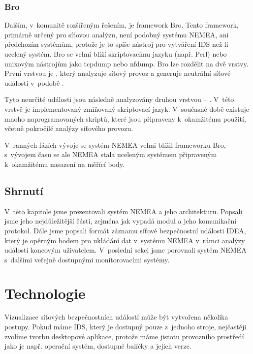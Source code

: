 \subsection*{Bro}
Dalším, v~komunitě rozšířeným řešením, je framework Bro. Tento framework, primárně určený pro síťovou analýzu, není podobný systému NEMEA, ani předchozím systémům, protože je to spíše nástroj pro vytváření IDS než-li ucelený systém. Bro se velmi blíží skriptovacímu jazyku (např. Perl) nebo unixovým nástrojům jako tcpdump nebo nfdump. Bro lze rozdělit na dvě vrstvy. První vrstvou je , který analyzuje síťový provoz a generuje neutrální síťové události v~podobě . 

Tyto neurčité události jsou následně analyzovány druhou vrstvou -- . V~této vrstvě je implementovaný zmiňovaný skriptovací jazyk. V~současné době existuje mnoho naprogramovaných skriptů, které jsou připraveny k~okamžitému použití, včetně pokročilé analýzy síťového provozu.

V~ranných fázích vývoje se systém NEMEA velmi blížil frameworku Bro, s~vývojem času se ale NEMEA stala uceleným systémem připraveným k~okamžitému nasazení na měřící body.

\section{Shrnutí}

V~této kapitole jsme prezentovali systém NEMEA a jeho architekturu. Popsali jsme jeho nejdůležitější části, zejména jak vypadá modul a jeho komunikační protokol. Dále jsme popsali formát záznamu síťové bezpečnostní události IDEA, který je opěrným bodem pro ukládání dat v~systému NEMEA v~rámci analýzy událostí koncovým uživatelem. V~poslední sekci jsme porovnali systém NEMEA s~dalšími veřejně dostupnými monitorovacími systémy.


\chapter{Technologie}

Vizualizace síťových bezpečnostních událostí může být vytvořena několika postupy. Pokud máme IDS, který je dostupný pouze z~jednoho stroje, nejčastěji zvolíme tvorbu desktopové aplikace, protože máme jistotu provozního prostředí jako je např. operační systém, dostupné balíčky a jejich verze. 

